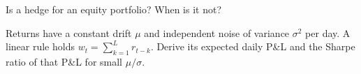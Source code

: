 \begin{interviewq}\label{iq:s1:trend-following:5}
Is  a hedge for an equity portfolio? When is it not?
\end{interviewq}

\begin{interviewq}\label{iq:s1:trend-following:6}
Returns have a constant drift $\mu$ and independent noise of variance $\sigma^2$ per day. A linear rule holds $w_t = \sum_{k=1}^{L} r_{t-k}$. Derive its
expected daily P\&L and the Sharpe ratio of that P\&L for small $\mu/\sigma$.
\end{interviewq}
